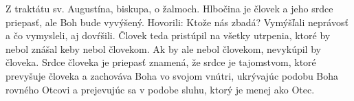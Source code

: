 Z traktátu sv. Augustína, biskupa, o žalmoch.
\versseparator
Hlbočina je človek a jeho srdce priepasť, ale Boh bude vyvýšený.
Hovorili: Ktože nás zbadá?
Vymýšľali neprávosť a čo vymysleli, aj dovŕšili. 
Človek teda pristúpil na všetky utrpenia, ktoré by nebol znášal keby nebol človekom. Ak by ale nebol človekom, nevykúpil by človeka.
Srdce človeka je priepasť znamená, že srdce je tajomstvom, ktoré prevyšuje človeka a zachováva Boha vo svojom vnútri, ukrývajúc podobu Boha rovného Otcovi a prejevujúc sa v podobe sluhu, ktorý je menej ako Otec.
